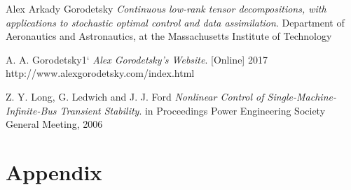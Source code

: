 \documentclass[11pt,draftd]{article}
\begin{document}
\begin{thebibliography}{9}
	Alex Arkady Gorodetsky
	\textit{Continuous low-rank tensor decompositions, with applications to stochastic optimal control and data assimilation}.
	Department of Aeronautics and Astronautics, at the Massachusetts Institute of Technology
	
	A. A. Gorodetsky1`
	\textit{Alex Gorodetsky's Website}.
	[Online] 2017
	http://www.alexgorodetsky.com/index.html
	
	Z. Y. Long, G. Ledwich and J. J. Ford
	\textit{Nonlinear Control of Single-Machine-Infinite-Bus Transient Stability}.
	in Proceedings Power Engineering Society General Meeting, 2006
	
\end{thebibliography}
\newpage
\section{Appendix}
\end{document}
